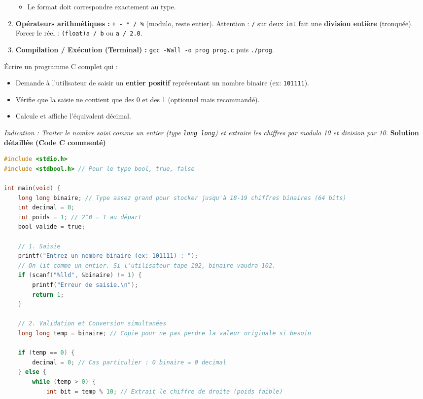 \documentclass[11pt]{article}
\begin{document}
\begin{methode}
\begin{enumerate}
\begin{itemize}
            \item Le format doit correspondre exactement au type.
        \end{itemize}
        \item \textbf{Opérateurs arithmétiques :} \texttt{+ - * / \%} (modulo, reste entier). Attention : \texttt{/} sur deux \texttt{int} fait une \textbf{division entière} (tronquée). Forcer le réel : \texttt{(float)a / b} ou \texttt{a / 2.0}.
        \item \textbf{Compilation / Exécution (Terminal) :} \texttt{gcc -Wall -o prog prog.c} puis \texttt{./prog}.
    \end{enumerate}
\end{methode}

\begin{exoresolu}
    Écrire un programme C complet qui :
    \begin{itemize}
        \item Demande à l'utilisateur de saisir un \textbf{entier positif} représentant un nombre binaire (ex: \texttt{101111}).
        \item Vérifie que la saisie ne contient que des 0 et des 1 (optionnel mais recommandé).
        \item Calcule et affiche l'équivalent décimal.
    \end{itemize}
    \textit{Indication : Traiter le nombre saisi comme un entier (type \texttt{long long}) et extraire les chiffres par modulo 10 et division par 10.}
    \tcblower
    \textbf{Solution détaillée (Code C commenté)}
    \begin{lstlisting}[language=C]
#include <stdio.h>
#include <stdbool.h> // Pour le type bool, true, false

int main(void) {
    long long binaire; // Type assez grand pour stocker jusqu'à 18-19 chiffres binaires (64 bits)
    int decimal = 0;
    int poids = 1; // 2^0 = 1 au départ
    bool valide = true;

    // 1. Saisie
    printf("Entrez un nombre binaire (ex: 101111) : ");
    // On lit comme un entier. Si l'utilisateur tape 102, binaire vaudra 102.
    if (scanf("%lld", &binaire) != 1) {
        printf("Erreur de saisie.\n");
        return 1;
    }

    // 2. Validation et Conversion simultanées
    long long temp = binaire; // Copie pour ne pas perdre la valeur originale si besoin
    
    if (temp == 0) {
        decimal = 0; // Cas particulier : 0 binaire = 0 decimal
    } else {
        while (temp > 0) {
            int bit = temp % 10; // Extrait le chiffre de droite (poids faible)
            

\end{lstlisting}
\end{exoresolu}
\end{document}
